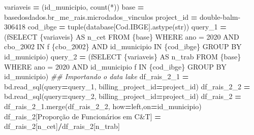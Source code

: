 \documentclass[
  12,
  dvipsnames]{article}
\newenvironment{Shaded}{\begin{snugshade}}{\end{snugshade}}
\newcommand{\BuiltInTok}[1]{#1}
\newcommand{\CommentTok}[1]{\textcolor[rgb]{0.56,0.35,0.01}{\textit{#1}}}
\newcommand{\NormalTok}[1]{#1}
\newcommand{\OperatorTok}[1]{\textcolor[rgb]{0.81,0.36,0.00}{\textbf{#1}}}
\newcommand{\SpecialCharTok}[1]{\textcolor[rgb]{0.00,0.00,0.00}{#1}}
\newcommand{\SpecialStringTok}[1]{\textcolor[rgb]{0.31,0.60,0.02}{#1}}
\newcommand{\StringTok}[1]{\textcolor[rgb]{0.31,0.60,0.02}{#1}}
\begin{document}
\begin{Shaded}
\begin{Highlighting}[]
\NormalTok{variaveis }\OperatorTok{=}\NormalTok{ (}\StringTok{\textquotesingle{}id\_municipio, count(*)\textquotesingle{}}\NormalTok{)}
\NormalTok{base }\OperatorTok{=} \StringTok{\textquotesingle{}\textasciigrave{}basedosdados.br\_me\_rais.microdados\_vinculos\textasciigrave{}\textquotesingle{}}
\NormalTok{project\_id }\OperatorTok{=} \StringTok{\textquotesingle{}double{-}balm{-}306418\textquotesingle{}}
\NormalTok{cod\_ibge }\OperatorTok{=} \BuiltInTok{tuple}\NormalTok{(database[}\StringTok{\textquotesingle{}Cod.IBGE\textquotesingle{}}\NormalTok{].astype(}\BuiltInTok{str}\NormalTok{))}
\NormalTok{query\_1 }\OperatorTok{=}\NormalTok{ (}\SpecialStringTok{f\textquotesingle{}SELECT }\SpecialCharTok{\{}\NormalTok{variaveis}\SpecialCharTok{\}}\SpecialStringTok{ AS n\_cet FROM }\SpecialCharTok{\{}\NormalTok{base}\SpecialCharTok{\}}\SpecialStringTok{ WHERE ano = 2020 AND cbo\_2002 IN\textquotesingle{}} 
           \SpecialStringTok{f\textquotesingle{} }\SpecialCharTok{\{}\NormalTok{cbo\_2002}\SpecialCharTok{\}}\SpecialStringTok{ AND id\_municipio IN }\SpecialCharTok{\{}\NormalTok{cod\_ibge}\SpecialCharTok{\}}\SpecialStringTok{ GROUP BY id\_municipio\textquotesingle{}}\NormalTok{)}
\NormalTok{query\_2 }\OperatorTok{=}\NormalTok{ (}\SpecialStringTok{f\textquotesingle{}SELECT }\SpecialCharTok{\{}\NormalTok{variaveis}\SpecialCharTok{\}}\SpecialStringTok{ AS n\_trab FROM }\SpecialCharTok{\{}\NormalTok{base}\SpecialCharTok{\}}\SpecialStringTok{ WHERE ano = 2020 AND id\_municipio\textquotesingle{}} 
           \SpecialStringTok{f\textquotesingle{} IN }\SpecialCharTok{\{}\NormalTok{cod\_ibge}\SpecialCharTok{\}}\SpecialStringTok{ GROUP BY id\_municipio\textquotesingle{}}\NormalTok{)}
\CommentTok{\#\# Importando o data lake}
\NormalTok{df\_rais\_2\_1 }\OperatorTok{=}\NormalTok{ bd.read\_sql(query}\OperatorTok{=}\NormalTok{query\_1, billing\_project\_id}\OperatorTok{=}\NormalTok{project\_id)}
\NormalTok{df\_rais\_2\_2 }\OperatorTok{=}\NormalTok{ bd.read\_sql(query}\OperatorTok{=}\NormalTok{query\_2, billing\_project\_id}\OperatorTok{=}\NormalTok{project\_id)}
\NormalTok{df\_rais\_2 }\OperatorTok{=}\NormalTok{ df\_rais\_2\_1.merge(df\_rais\_2\_2, how}\OperatorTok{=}\StringTok{\textquotesingle{}left\textquotesingle{}}\NormalTok{,on}\OperatorTok{=}\StringTok{\textquotesingle{}id\_municipio\textquotesingle{}}\NormalTok{) }
\NormalTok{df\_rais\_2[}\StringTok{\textquotesingle{}Proporção de Funcionários em C\&T\textquotesingle{}}\NormalTok{] }\OperatorTok{=}\NormalTok{ df\_rais\_2[}\StringTok{\textquotesingle{}n\_cet\textquotesingle{}}\NormalTok{]}\OperatorTok{/}\NormalTok{df\_rais\_2[}\StringTok{\textquotesingle{}n\_trab\textquotesingle{}}\NormalTok{]}


\end{Highlighting}
\end{Shaded}
\end{document}
